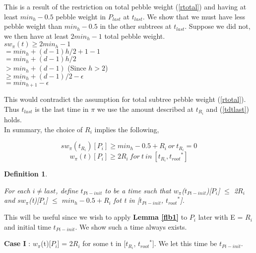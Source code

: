 \documentclass[12pt]{article}
\newtheorem{definition}[theorem]{Definition}
\newcommand{\troots}{{t_{root}}^*}
\begin{document}
This is a result of the restriction on total pebble weight (\ref{rtotal}) and having at least $min_h-0.5$ pebble weight in $P_{last}$ at $t_{last}$. We show that we must have less pebble weight than $min_h-0.5$ in the other subtrees at $t_{last}$. Suppose we did not, we then have at least $2min_h -1$ total pebble weight.\\

\noindent
$sw_{\pi}(t) \geq 2min_h -1$\\
$= min_h +(d-1)h/2 + 1 - 1$\\
$= min_h +(d-1)h/2$\\
$> min_h +(d-1)$   (Since $h > 2$)\\
$\geq  min_h +(d-1)/2 - \epsilon$\\
$= min_{h+1}- \epsilon$

This would contradict the assumption for total subtree pebble weight (\ref{rtotal}). Thus $t_{last}$ is the last time in $\pi$ we use the amount described at $t_{R_i}$ and (\ref{tdtlast}) holds.\\



In summary, the choice of ${R_i}$ implies the following, 

\begin{equation}sw_{\pi}(t_{R_i})[P_i]  \geq min_h-0.5+{R_i}~or~t_{R_i} = 0\label{tdamt}\end{equation}
\begin{equation}w_{\pi}(t)[P_i] \geq 2{R_i}~for~t~in~[t_{R_i}, \troots]\label{tdres}\end{equation}

\begin{definition}\label{ddr2}

For each $i \ne last$, define $t_{Pi-init}$ to be a time such that $w_{\pi}$($t_{Pi-init}$)[$P_i$] $\leq$ 2$R_i$ and $sw_{\pi}$(t)[$P_i$] $\leq$ $min_h-0.5+R_i$ fot t in [$t_{Pi-init}$, $\troots$]. 
\end{definition}

This will be useful since we wish to apply {\bf Lemma \ref{flb1}} to $P_i$ later with E = $R_i$ and initial time $t_{Pi-init}$. We show such a time always exists.

\noindent
{\bf Case I} : $w_{\pi}$(t)[$P_i$] = 2$R_i$ for some t in [$t_{R_i}$, $\troots$]. We let this time be $t_{Pi-init}$.
\end{document}
